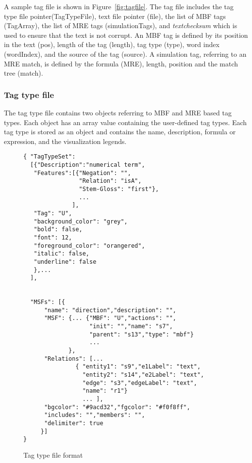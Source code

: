 A sample tag file is shown in Figure~\ref{fig:tagfile}. 
The tag file includes the tag type file pointer(TagTypeFile), 
text file pointer (file), the list of MBF tags (TagArray), 
the list of MRE tags (simulationTags), 
and {\em textchecksum} which is used to ensure that the 
text is not corrupt. 
An MBF tag is defined by its position in the text (pos), length of the tag (length), 
tag type (type), word index (wordIndex), and the source of the tag (source). 
A simulation tag, referring to an MRE match, is defined by the formula (MRE), length, position and the match tree (match).

\subsubsection{Tag type file}

The tag type file contains two objects referring to MBF and MRE based tag types. 
Each object has an array value containing the user-defined tag types. 
Each tag type is stored as an object and contains the name, description, formula or expression, and the visualization legends.

\begin{figure}[h!]
\begingroup
    \fontsize{8pt}{12pt}\selectfont
\begin{multicols}{2}
\begin{verbatim}
{ "TagTypeSet":
  [{"Description":"numerical term",
   "Features":[{"Negation": "",
                "Relation": "isA",
                "Stem-Gloss": "first"},
                ... 
              ],
   "Tag": "U",
   "background_color": "grey",
   "bold": false,
   "font": 12,
   "foreground_color": "orangered",
   "italic": false,
   "underline": false
   },...
  ],

  
  "MSFs": [{
      "name": "direction","description": "",
  	  "MSF": {... {"MBF": "U","actions": "",
  	               "init": "","name": "s7",
  	               "parent": "s13","type": "mbf"} 
  	               ... 
  	         },
  	  "Relations": [...
  	           { "entity1": "s9","e1Label": "text",
  	             "entity2": "s14","e2Label": "text",
  	             "edge": "s3","edgeLabel": "text",
  	             "name": "r1"} 
  	             ... ],
      "bgcolor": "#9acd32","fgcolor": "#f0f8ff",
      "includes": "","members": "",
      "delimiter": true
     }]
}
\end{verbatim}
\end{multicols}
\endgroup
\caption{Tag type file format}
\label{fig:tagtypefile}
\end{figure}

